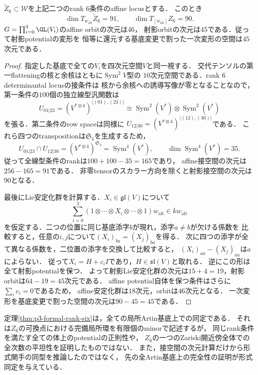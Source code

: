 \begin{proposition}[可換potential点の接空間と軌道]
\label{prop:p3-rank-six-tangent}
$\widetilde Z_6\subset\mathcal W$を上記二つのrank $6$条件のaffine locusとする．
このとき
\[
 \dim T_{w_{\mathrm{alt}}}\widetilde Z_6=91,
 \qquad
 \dim T_{[w_{\mathrm{alt}}]}Z_6=90.
\]
$G=\prod_{i=0}^3\GL(V_i)$のaffine orbitの次元は$46$，
射影orbitの次元は$45$である．従って射影potentialの変形を
恒等に還元する基底変更で割った一次変形の空間は$45$次元である．
\end{proposition}
\begin{proof}
指定した基底で全ての$V_i$を四次元空間$V$と同一視する．
交代テンソルの第一flatteningの核と余核はともに$\operatorname{Sym}^2V$型の
$10$次元空間である．rank $6$ determinantal locusの接条件は
核から余核への誘導写像が零となることなので，
第一条件の$100$個の独立線型汎関数は
\[
 U_{01|23}=
 (V^{*\otimes4})^{\langle(01),(23)\rangle}
 \cong\operatorname{Sym}^2(V^*)\otimes\operatorname{Sym}^2(V^*)
\]
を張る．第二条件のrow spaceは同様に
$U_{12|30}=(V^{*\otimes4})^{\langle(12),(30)\rangle}$である．
これら四つのtranspositionは$\mathfrak S_4$を生成するため，
\[
 U_{01|23}\cap U_{12|30}
   =(V^{*\otimes4})^{\mathfrak S_4}
   =\operatorname{Sym}^4(V^*),
 \qquad \dim\operatorname{Sym}^4(V^*)=35.
\]
従って全線型条件のrankは$100+100-35=165$であり，
affine接空間の次元は$256-165=91$である．
非零tensorのスカラー方向を除くと射影接空間の次元は$90$となる．

最後にLie安定化群を計算する．$X_i\in\mathfrak{gl}(V)$について
\[
 \sum_{i=0}^3
 (1\otimes\cdots\otimes X_i\otimes\cdots\otimes1)w_{\mathrm{alt}}
 \in k w_{\mathrm{alt}}
\]
を仮定する．二つの位置に同じ基底添字$b$が現れ，添字$a\ne b$が欠ける係数を
比較すると，任意の$i,j$について$(X_i)_{ba}=(X_j)_{ba}$を得る．
次に四つの添字が全て異なる係数を，二位置の添字を交換して比較すると，
$(X_i)_{aa}-(X_j)_{aa}$は$a$によらない．
従って$X_i=H+c_iI$であり，$H\in\mathfrak{sl}(V)$と取れる．
逆にこの形は全て射影potentialを保つ．
よって射影Lie安定化群の次元は$15+4=19$，射影orbitは$64-19=45$次元である．
affine potential自体を保つ条件はさらに$\sum_i c_i=0$であるため，
affine安定化群は$18$次元，orbitは$46$次元となる．
一次変形を基底変更で割った空間の次元は$90-45=45$である．
\end{proof}

\begin{remark}[形式模型の範囲]
定理\ref{thm:p3-formal-rank-six}は，全ての局所Artin基底上での同定である．
それは$Z_6$の可換点における完備局所環を有限個のminorで記述するが，
同じrank条件を満たす全ての体上のpotentialの正則性や，
$Z_6$の一つのZariski開近傍全体での全次数の平坦性を証明したものではない．
また，接空間の次元計算だけから形式関手の同型を推論したのではなく，
先の全Artin基底上の完全性の証明が形式同定を与えている．
\end{remark}

